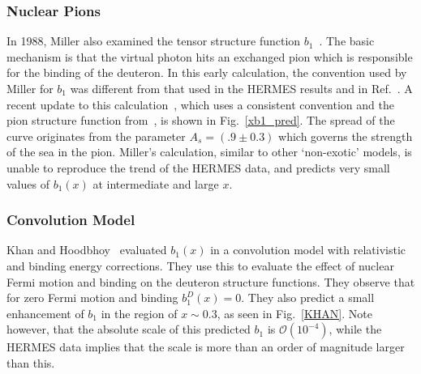 \subsubsection{Nuclear Pions}
In 1988, Miller also examined the tensor structure function $b_1$~\cite{Miller:1989nc}.
The basic mechanism is that the virtual photon hits an exchanged pion  which
is responsible for the binding of the deuteron. 
In this early calculation, the convention used by Miller for $b_1$ was different from that
used in the HERMES results and in Ref.~\cite{Kumano:2010vz}. A recent update to this  
calculation~\cite{Miller_tmp}, which uses a consistent convention and the pion structure
function from~\cite{Sutton:1991ay}, is shown in Fig.~\ref{xb1_pred}. The spread of the curve originates from the 
parameter $A_s=(.9 \pm 0.3)$ which governs the strength of the sea in the pion. 
Miller's calculation, similar to other `non-exotic' models, is unable to reproduce the trend of the HERMES data, and predicts very small values of $b_1(x)$ at intermediate and large $x$.

\subsubsection{Convolution Model}
Khan and Hoodbhoy~\cite{Khan:1991qk} evaluated $b_1(x)$ in a convolution model with relativistic and binding energy corrections.  They use this to evaluate the effect of nuclear Fermi motion and binding on the deuteron structure functions.  They observe that for zero Fermi motion and binding $b_1^D(x)=0$.  
They also predict a small enhancement of $b_1$ in the region of $x\sim 0.3$, as seen in Fig.~\ref{KHAN}.  Note however, that the absolute scale of this predicted $b_1$ is 
$\mathcal{O}(10^{-4})$, while the HERMES data implies that the scale is more than an order of magnitude larger than this.

